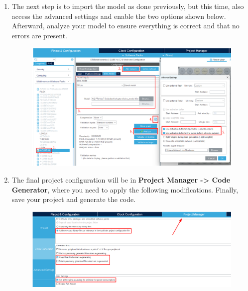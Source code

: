 \documentclass[10pt,a4paper,onecolumn]{article}
\begin{document}
\begin{enumerate}
\item
  The next step is to import the model as done previously, but this
  time, also access the advanced settings and enable the two options
  shown below. Afterward, analyze your model to ensure everything is
  correct and that no errors are present.

  \begin{figure}[H]
    \begin{center}
      \includegraphics[width=\dimexpr\textwidth-1cm\relax,height=\dimexpr0.25\textheight-3cm\relax,keepaspectratio]{images/69.png}
    \end{center}
  \end{figure}

\item
  The final project configuration will be in \textbf{Project Manager
  -\textgreater{} Code Generator}, where you need to apply the following
  modifications. Finally, save your project and generate the code.

  \begin{figure}[H]
    \begin{center}
      \includegraphics[width=\dimexpr\textwidth-1cm\relax,height=\dimexpr0.25\textheight-3cm\relax,keepaspectratio]{images/70.png}
    \end{center}
  \end{figure}


\end{enumerate}
\end{document}
